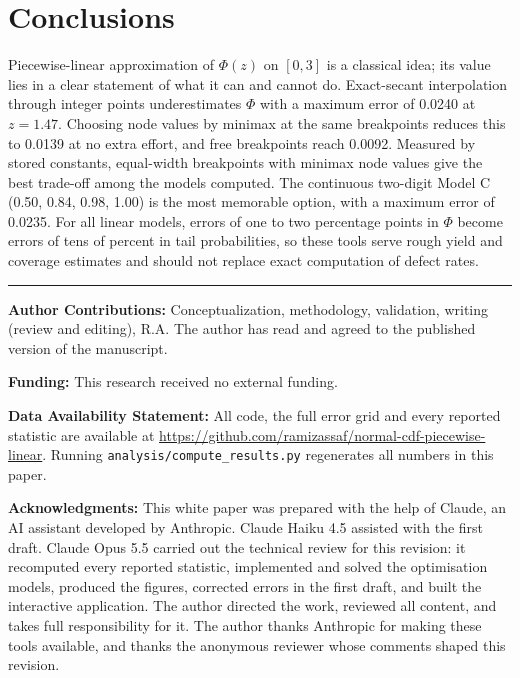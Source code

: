 \documentclass[10pt,a4paper]{article}
\begin{document}
\section{Conclusions}

Piecewise-linear approximation of $\Phi(z)$ on $[0,3]$ is a classical idea; its value lies in a clear statement of what it can and cannot do. Exact-secant interpolation through integer points underestimates $\Phi$ with a maximum error of 0.0240 at $z = 1.47$. Choosing node values by minimax at the same breakpoints reduces this to 0.0139 at no extra effort, and free breakpoints reach 0.0092. Measured by stored constants, equal-width breakpoints with minimax node values give the best trade-off among the models computed. The continuous two-digit Model C (0.50, 0.84, 0.98, 1.00) is the most memorable option, with a maximum error of 0.0235. For all linear models, errors of one to two percentage points in $\Phi$ become errors of tens of percent in tail probabilities, so these tools serve rough yield and coverage estimates and should not replace exact computation of defect rates.

\vspace{10pt}
\noindent\textcolor{rulegray}{\rule{\textwidth}{0.4pt}}
\small

\vspace{4pt}\noindent\textbf{Author Contributions:} Conceptualization, methodology, validation, writing (review and editing), R.A. The author has read and agreed to the published version of the manuscript.

\vspace{4pt}\noindent\textbf{Funding:} This research received no external funding.

\vspace{4pt}\noindent\textbf{Data Availability Statement:} All code, the full error grid and every reported statistic are available at \url{https://github.com/ramizassaf/normal-cdf-piecewise-linear}. Running \texttt{analysis/compute\_results.py} regenerates all numbers in this paper.

\vspace{4pt}\noindent\textbf{Acknowledgments:} This white paper was prepared with the help of Claude, an AI assistant developed by Anthropic. Claude Haiku 4.5 assisted with the first draft. Claude Opus 5.5 carried out the technical review for this revision: it recomputed every reported statistic, implemented and solved the optimisation models, produced the figures, corrected errors in the first draft, and built the interactive application. The author directed the work, reviewed all content, and takes full responsibility for it. The author thanks Anthropic for making these tools available, and thanks the anonymous reviewer whose comments shaped this revision.
\end{document}
